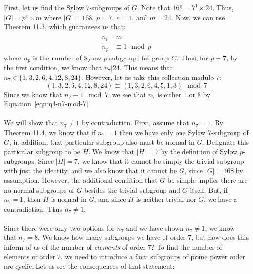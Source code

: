 \documentclass[letterpaper]{article}
\begin{document}
\section{}
\label{sec:Question4}
First, let us find the Sylow 7-subgroups of $ G $.
Note that $ 168 = 7^{1} \times 24 $.
Thus, $ |G| = p^e \times m $ where $ |G| = 168 $, $ p = 7 $, $ e = 1 $, and $ m = 24 $.
Now, we can use Theorem 11.3, which guarantees us that:
\begin{align}
    n_p &| m \\
    n_p &\equiv 1 \mod{p}
\end{align}
where $ n_p $ is the number of Sylow $ p $-subgroups for group $ G $.
Thus, for $ p = 7 $, by the first condition, we know that $ n_7 | 24 $.
This means that $ n_7 \in \{1, 3, 2, 6, 4, 12, 8, 24\} $.
However, let us take this collection modulo $ 7 $:
\begin{equation}
    \label{eqn:q4-n7-mod-7}
    (1, 3, 2, 6, 4, 12, 8, 24) \equiv (1, 3, 2, 6, 4, 5, 1, 3) \mod{7}
\end{equation}
Since we know that $ n_7 \equiv 1 \mod{7} $, we see that $ n_7 $ is either $ 1 $ or $ 8 $ by Equation~\ref{eqn:q4-n7-mod-7}.
\\ \\
We will show that $ n_7 \neq 1 $ by contradiction.
First, assume that $ n_7 = 1 $.
By Theorem 11.4, we know that if $ n_7 = 1 $ then we have only one Sylow 7-subgroup of $ G $; in addition, that particular subgroup also must be normal in $ G $.
Designate this particular subgroup to be $ H $.
We know that $ |H| = 7 $ by the definition of Sylow $ p $-subgroups.
Since $ |H| = 7 $, we know that it cannot be simply the trivial subgroup with just the identity, and we also know that it cannot be $ G $, since $ |G| = 168 $ by assumption.
However, the additional condition that $ G $ be simple implies there are no normal subgroups of $ G $ besides the trivial subgroup and $ G $ itself.
But, if $ n_7 = 1 $, then $ H $ is normal in $ G $, and since $ H $ is neither trivial nor $ G $, we have a contradiction.
Thus $ n_7 \neq 1 $.
\\ \\
Since there were only two options for $ n_7 $ and we have shown $ n_7 \neq 1 $, we know that $ n_7 = 8 $.
We know how many subgroups we have of order $ 7 $, but how does this inform of us of the number of \textit{elements} of order $ 7 $?
To find the number of elements of order $ 7 $, we need to introduce a fact: subgroups of prime power order are cyclic.
Let us see the consequences of that statement:
\end{document}
